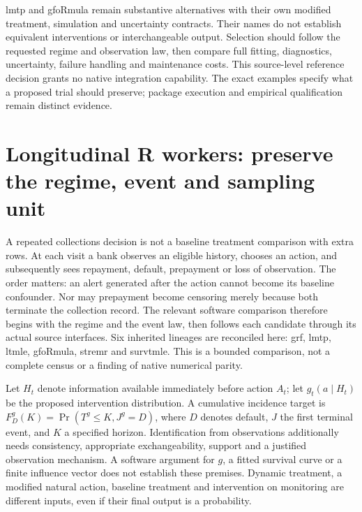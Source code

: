 lmtp and gfoRmula remain substantive alternatives with their own modified
treatment, simulation and uncertainty contracts. Their names do not establish
equivalent interventions or interchangeable output. Selection should follow
the requested regime and observation law, then compare full fitting,
diagnostics, uncertainty, failure handling and maintenance costs. This
source-level reference decision grants no native integration capability.
The exact examples specify what a proposed trial should preserve; package
execution and empirical qualification remain distinct evidence.




\section{Longitudinal R workers: preserve the regime, event and sampling unit}
\label{sec:exec23-longr-workers}
A repeated collections decision is not a baseline treatment comparison with
extra rows. At each visit a bank observes an eligible history, chooses an
action, and subsequently sees repayment, default, prepayment or loss of
observation. The order matters: an alert generated after the action cannot
become its baseline confounder. Nor may prepayment become censoring merely
because both terminate the collection record. The relevant software comparison
therefore begins with the regime and the event law, then follows each candidate
through its actual source interfaces. Six inherited lineages are reconciled
here: grf, lmtp, ltmle, gfoRmula, stremr and survtmle. This is a bounded comparison,
not a complete census or a finding of native numerical parity.

Let $H_t$ denote information available immediately before action $A_t$; let
$g_t(a\mid H_t)$ be the proposed intervention distribution. A cumulative
incidence target is $F_D^g(K)=\Pr(T^g\leq K,J^g=D)$, where $D$ denotes default,
$J$ the first terminal event, and $K$ a specified horizon. Identification from
observations additionally needs consistency, appropriate exchangeability,
support and a justified observation mechanism. A software argument for
$g$, a fitted survival curve or a finite influence vector does not establish
these premises. Dynamic treatment, a modified natural action, baseline
treatment and intervention on monitoring are different inputs, even if their
final output is a probability.

